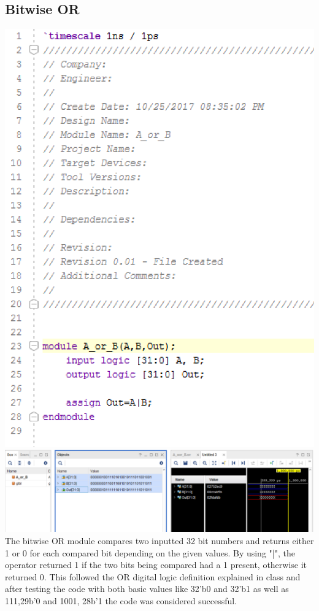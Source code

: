 \documentclass{article}
\begin{document}
\subsection{Bitwise OR}
\includegraphics[scale=0.5]{photos/or_code}
\break
\includegraphics[scale=0.4]{photos/or_simulation}
\break
The bitwise OR module compares two inputted 32 bit numbers and returns either 1 or 0 for each compared bit depending on the given values. By using "|", the operator returned 1 if the two bits being compared had a 1 present, otherwise it returned 0. This followed the OR digital logic definition explained in class and after testing the code with both basic values like {32'b0} and {32'b1} as well as {111,29b'0} and {1001, 28b'1} the code was considered successful.
\end{document}
